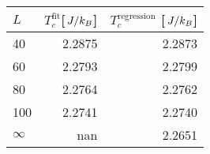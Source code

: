 \begin{tabular}{lrr}
\toprule
$L$ & $T_c^\mathrm{fit}$[$\,J/k_B$] & $T_c^\mathrm{regression}$ [$\,J/k_B$] \\
\midrule
40 & 2.2875 & 2.2873 \\
60 & 2.2793 & 2.2799 \\
80 & 2.2764 & 2.2762 \\
100 & 2.2741 & 2.2740 \\
$\infty$ & nan & 2.2651 \\
\bottomrule
\end{tabular}
